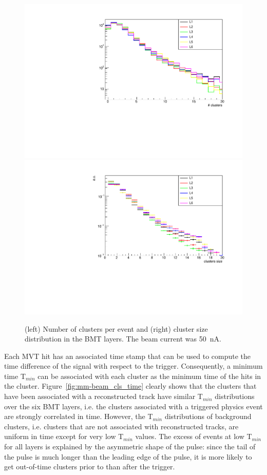 \begin{figure}[!htb]
\centering
 \includegraphics[width=.49\textwidth,keepaspectratio]{images/beam_num_cls.pdf}
 \includegraphics[width=.49\textwidth,keepaspectratio]{images/beam_cls_size.pdf}
 \caption{(left) Number of clusters per event and (right) cluster size distribution in the BMT layers. The beam current
   was 50~nA.}
 \label{fig:mm-beam_cls}
\end{figure}

Each MVT hit has an associated time stamp that can be used to compute the time difference of the signal with respect to
the trigger. Consequently, a minimum time T$_{min}$ can be associated with each cluster as the minimum time of the hits
in the cluster. Figure~\ref{fig:mm-beam_cls_time} clearly shows that the clusters that have been associated with a
reconstructed track have similar T$_{min}$ distributions over the six BMT layers, i.e. the clusters associated with a
triggered physics event are strongly correlated in time. However, the T$_{min}$ distributions of background clusters,
i.e. clusters that are not associated with reconstructed tracks, are uniform in time except for very low T$_{min}$ values.
The excess of events at low T$_{min}$ for all layers is explained by the asymmetric shape of the pulse: since the tail of
the pulse is much longer than the leading edge of the pulse, it is more likely to get out-of-time clusters prior to than
after the trigger.

